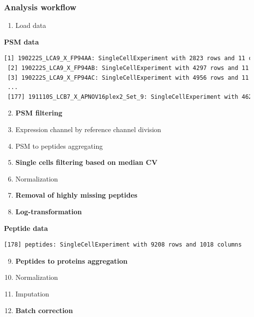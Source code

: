 \documentclass{beamer}
\newcommand{\frametitlesection}[1]{\frametitle{\centering #1 \footnotesize \hspace{0pt plus 1 filll} \insertsection}}
\begin{document}
\begin{frame}[fragile]
    \frametitlesection{Analysis workflow}

    \scriptsize

    \begin{enumerate}
        \item Load data
    \end{enumerate}

    \textbf{PSM data}

    \begin{lstlisting}[language = TeX, numbers = none, basicstyle = \ttfamily\@setfontsize{\srcsize}{5pt}{5pt}\color{vdgray}]
 [1] 190222S_LCA9_X_FP94AA: SingleCellExperiment with 2823 rows and 11 columns
 [2] 190222S_LCA9_X_FP94AB: SingleCellExperiment with 4297 rows and 11 columns
 [3] 190222S_LCA9_X_FP94AC: SingleCellExperiment with 4956 rows and 11 columns
 ...
 [177] 191110S_LCB7_X_APNOV16plex2_Set_9: SingleCellExperiment with 4626 rows and 16 columns
    \end{lstlisting}

    \pause

    \begin{enumerate}
        \setcounter{enumi}{1}
        \item \textbf<4>{PSM filtering}
        \item Expression channel by reference channel division
        \item PSM to peptides aggregating
        \item \textbf<4>{Single cells filtering based on median CV}
        \item Normalization
        \item \textbf<4>{Removal of highly missing peptides}
        \item \textbf<4>{Log-transformation}
    \end{enumerate}

    \textbf{Peptide data}

    \begin{lstlisting}[language = TeX, numbers = none, basicstyle = \ttfamily\@setfontsize{\srcsize}{5pt}{5pt}\color{vdgray}]
 [178] peptides: SingleCellExperiment with 9208 rows and 1018 columns
    \end{lstlisting}

    \pause

    \begin{enumerate}
        \setcounter{enumi}{8}
        \item \textbf<4>{Peptides to proteins aggregation}
        \item Normalization
        \item Imputation
        \item \textbf<4>{Batch correction}
    \end{enumerate}


\end{frame}
\end{document}

